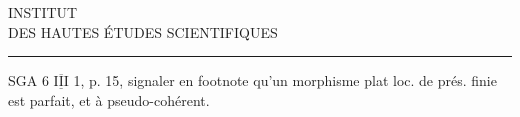 \begin{center}
INSTITUT\\
DES HAUTES ÉTUDES SCIENTIFIQUES\\[-.4ex]
\rule{1.4cm}{.4pt}
\end{center}

SGA 6 $\overline{\underline{\mathrm{III}}}$ 1, p. 15, signaler en footnote qu'un morphisme plat loc. de prés. finie est parfait, et à  pseudo-cohérent.
